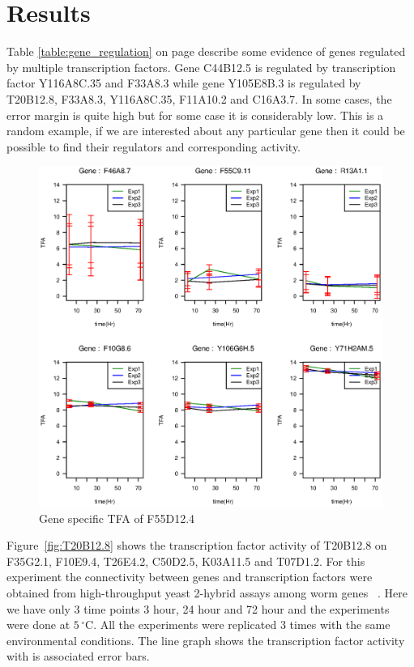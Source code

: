 \documentclass[12pt]{article}
\begin{document}
\section{Results}\label{results}
Table \ref{table:gene_regulation} on page \pageref{table:gene_regulation} describe some evidence of genes regulated 
by multiple transcription factors. Gene C44B12.5 is regulated by transcription factor Y116A8C.35 and 
F33A8.3 while gene Y105E8B.3 is regulated by T20B12.8, F33A8.3, Y116A8C.35, F11A10.2 and C16A3.7. 
In some cases, the error margin is quite high but for some case it is considerably low. 
This is a random example, if we are interested about any particular gene then 
it could be possible to find their regulators and corresponding activity.

\begin{figure}[!htb]
  \includegraphics[width=1.0\linewidth]{picture/F55D12_4_3dp_HS_LC_tfid8.eps}
  \caption{Gene specific TFA of F55D12.4}
  \label{fig:F55D12.4}
\end{figure}


Figure~\ref{fig:T20B12.8} shows the transcription factor activity of T20B12.8 on 
F35G2.1, F10E9.4, T26E4.2, C50D2.5, K03A11.5 and T07D1.2. For this experiment the connectivity 
between genes and transcription factors were obtained from 
high-throughput yeast 2-hybrid assays among worm genes ~\cite{wormnet:url}. Here we have only 3 time 
points 3 hour, 24 hour and 72 hour and the experiments were done at $5\,^{\circ}\mathrm{C}$. 
All the experiments were replicated 3 times with the same environmental conditions.
The line graph shows the transcription factor activity with is associated error bars.
\end{document}
